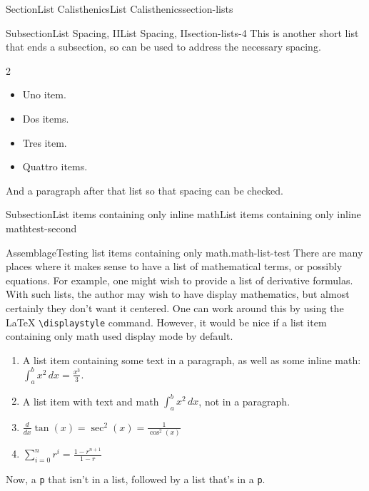 \documentclass[twoside,10pt,]{article}
\newcommand{\mono}[1]{\texttt{#1}}
\numberwithin{equation}{section}
\begin{document}
\begin{sectionptx}{Section}{List Calisthenics}{}{List Calisthenics}{}{}{section-lists}
\begin{subsectionptx}{Subsection}{List Spacing, II}{}{List Spacing, II}{}{}{section-lists-4}
This is another short list that ends a subsection, so can be used to address the necessary spacing.%
\begin{multicols}{2}
\begin{itemize}[label=\textbullet]
\item{}Uno item.%
\item{}Dos items.%
\item{}Tres item.%
\item{}Quattro items.%
\end{itemize}
\end{multicols}
%
\par
And a paragraph after that list so that spacing can be checked.%
\end{subsectionptx}
%
%
\typeout{************************************************}
\typeout{************************************************}
%
\begin{subsectionptx}{Subsection}{List items containing only inline math}{}{List items containing only inline math}{}{}{test-second}
\begin{assemblage}{Assemblage}{Testing list items containing only math.}{math-list-test}%
There are many places where it makes sense to have a list of mathematical terms, or possibly equations. For example, one might wish to provide a list of derivative formulas. With such lists, the author may wish to have display mathematics, but almost certainly they don't want it centered. One can work around this by using the \LaTeX{} \mono{\textbackslash{}displaystyle} command. However, it would be nice if a list item containing only math used display mode by default.%
\par
%
\begin{enumerate}
\item{}A list item containing some text in a paragraph, as well as some inline math: \(\int_a^b x^2\,dx = \frac{x^3}{3}\).%
\item{}A list item with text and math \(\int_a^b x^2\,dx\), not in a paragraph.%
\item{}\(\displaystyle \frac{d}{dx}\tan(x) = \sec^2(x) = \frac{1}{\cos^2(x)}\)%
\item{}\(\displaystyle \sum_{i=0}^n r^i = \frac{1-r^{n+1}}{1-r}\)%
\end{enumerate}
%
\par
Now, a \mono{p} that isn't in a list, followed by a list that's in a \mono{p}.%

\end{assemblage}
\end{subsectionptx}
\end{sectionptx}
\end{document}
